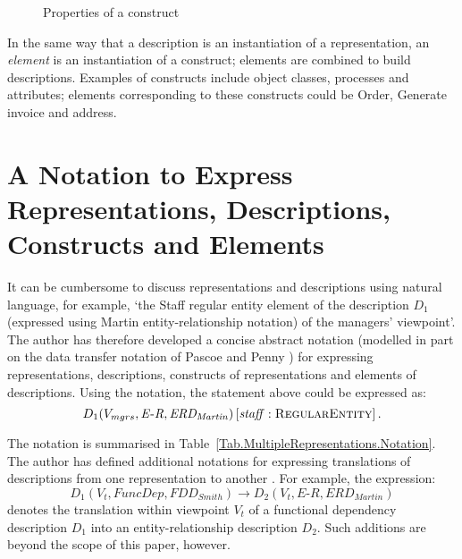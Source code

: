 \documentclass[10pt]{llncs}
\newcommand{\ER}{\mathit{E\textrm{-}R}}
\newcommand{\Martin}{\mathit{ERD_{Martin}}}
\newcommand{\FD}{\mathit{FuncDep}}
\newcommand{\Smith}{\mathit{FDD_{Smith}}}
\newcommand{\Description}[4]{\ensuremath{#1(#2,#3,#4)}}
\newcommand{\domain}[1]{\textsc{#1}}
\newcommand{\Elementt}[3]{\ensuremath{ #1 \left[ #2 : \domain{#3} \right] }}
\begin{document}

\begin{figure}[htbp]
	\centering
	\caption{Properties of a construct}
	\label{Fig.MultipleRepresentations.Properties}
\end{figure}


In the same way that a description is an instantiation of a representation, an \emph{element} is an instantiation of a construct; elements are combined to build descriptions. Examples of constructs include object classes, processes and attributes; elements corresponding to these constructs could be \textsf{Order}, \textsf{Generate invoice} and \textsf{address}.


\section{A Notation to Express Representations, Descriptions, Constructs and Elements}
\label{Sec:Notation}

It can be cumbersome to discuss representations and descriptions using natural language, for example, `the \textsf{Staff} regular entity element of the description $D_{1}$ (expressed using Martin entity-relationship notation) of the managers' viewpoint'. The author has therefore developed a concise abstract notation (modelled in part on the data transfer notation of Pascoe and Penny \cite{Pasc:RT:1995}) for expressing representations, descriptions, constructs of representations and elements of descriptions. Using the notation, the statement above could be expressed as:
\[	\Elementt{\Description{D_{1}}{V_{mgrs}}{\ER}{\Martin}}{\mathit{staff}}{RegularEntity}\text{.}	\]

The notation is summarised in Table~\ref{Tab.MultipleRepresentations.Notation}. The author has defined additional notations for expressing translations of descriptions from one representation to another \cite{Stan:N:1999:PhD}. For example, the expression:
\[	\Description{D_{1}}{V_{t}}{\FD}{\Smith} \rightarrow \Description{D_{2}}{V_{t}}{\ER}{\Martin}
\]
denotes the translation within viewpoint $V_{t}$ of a functional dependency description $D_{1}$ into an entity-relationship description $D_{2}$. Such additions are beyond the scope of this paper, however.

\end{document}

